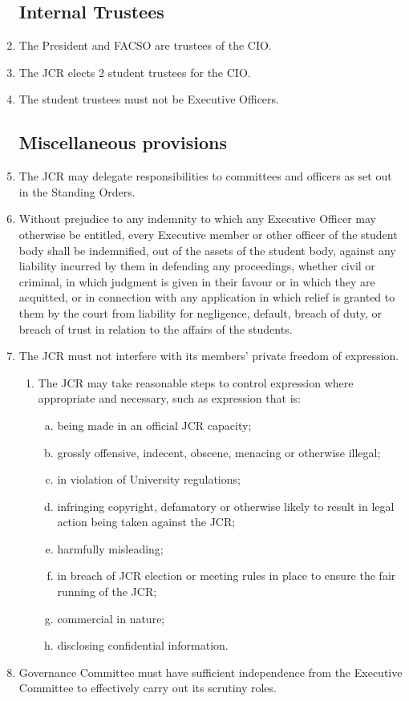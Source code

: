 \documentclass[12pt]{article}
\begin{document}
\begin{enumerate}
    \subsection{Internal Trustees}
    \item The President and FACSO are trustees of the CIO.
    \item The JCR elects 2 student trustees for the CIO.
    \item The student trustees must not be Executive Officers.

    \subsection{Miscellaneous provisions}
    \item The JCR may delegate responsibilities to committees and officers as set out in the Standing Orders.
    \item Without prejudice to any indemnity to which any Executive Officer may otherwise be entitled, every Executive member or other officer of the student body shall be indemnified, out of the assets of the student body, against any liability incurred by them in defending any proceedings, whether civil or criminal, in which judgment is given in their favour or in which they are acquitted, or in connection with any application in which relief is granted to them by the court from liability for negligence, default, breach of duty, or breach of trust in relation to the affairs of the students.
     \item The JCR must not interfere with its members' private freedom of expression.
    \begin{enumerate}
        \item The JCR may take reasonable steps to control expression where appropriate and necessary, such as expression that is:
        \begin{enumerate}[(a)]
            \item being made in an official JCR capacity;
            \item grossly offensive, indecent, obscene, menacing or otherwise illegal;
            \item in violation of University regulations;
            \item infringing copyright, defamatory or otherwise likely to result in legal action being taken against the JCR;
            \item harmfully misleading;
            \item in breach of JCR election or meeting rules in place to ensure the fair running of the JCR;
            \item commercial in nature;
            \item disclosing confidential information.
        \end{enumerate}
    \end{enumerate}
    \item Governance Committee must have sufficient independence from the Executive Committee to effectively carry out its scrutiny roles.
\end{enumerate}
\newpage
\end{document}
